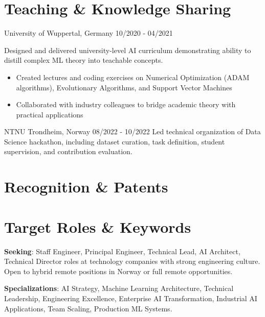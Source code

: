 \documentclass[singlesided,
               paper=a4,
               fontsize=10pt
              ]{my-resume}
\begin{document}
%
\clearpage
\pagestyle{empty}
%

\section[\faBook]{Teaching \& Knowledge Sharing}
    {University of Wuppertal, Germany}
    {10/2020 - 04/2021}
    {
        Designed and delivered university-level AI curriculum demonstrating ability to distill complex ML theory into teachable concepts.
        \begin{itemize}[leftmargin=2em]
            \item Created lectures and coding exercises on Numerical Optimization (ADAM algorithms), Evolutionary Algorithms, and Support Vector Machines
            \item Collaborated with industry colleagues to bridge academic theory with practical applications
        \end{itemize}
    }
%
	{NTNU Trondheim, Norway}
	{08/2022 - 10/2022}
    {
        Led technical organization of Data Science hackathon, including dataset curation, task definition, student supervision, and contribution evaluation.
    }

\section[\faTrophy]{Recognition \& Patents}

\section[\faGears]{Target Roles \& Keywords}
\textbf{Seeking}: Staff Engineer, Principal Engineer, Technical Lead, AI Architect, Technical Director roles at technology companies with strong engineering culture. Open to hybrid remote positions in Norway or full remote opportunities.

\textbf{Specializations}: AI Strategy, Machine Learning Architecture, Technical Leadership, Engineering Excellence, Enterprise AI Transformation, Industrial AI Applications, Team Scaling, Production ML Systems.
\end{document}
